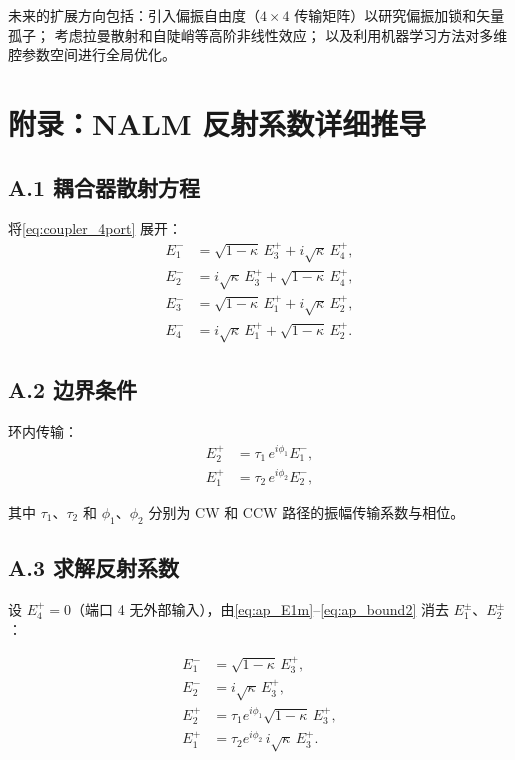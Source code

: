 \documentclass[11pt,a4paper]{ctexart}
\begin{document}
未来的扩展方向包括：引入偏振自由度（$4\times4$ 传输矩阵）以研究偏振加锁和矢量孤子；
考虑拉曼散射和自陡峭等高阶非线性效应；
以及利用机器学习方法对多维腔参数空间进行全局优化。

\section*{附录：NALM 反射系数详细推导}
\appendix

\subsection*{A.1 耦合器散射方程}

将\cref{eq:coupler_4port} 展开：
\begin{align}
  E_1^- &= \sqrt{1-\kappa}\, E_3^+ + i\sqrt{\kappa}\, E_4^+, \label{eq:ap_E1m}\\
  E_2^- &= i\sqrt{\kappa}\, E_3^+ + \sqrt{1-\kappa}\, E_4^+, \label{eq:ap_E2m}\\
  E_3^- &= \sqrt{1-\kappa}\, E_1^+ + i\sqrt{\kappa}\, E_2^+, \label{eq:ap_E3m}\\
  E_4^- &= i\sqrt{\kappa}\, E_1^+ + \sqrt{1-\kappa}\, E_2^+. \label{eq:ap_E4m}
\end{align}

\subsection*{A.2 边界条件}

环内传输：
\begin{align}
  E_2^+ &= \tau_1 \, e^{i\phi_1} E_1^-, \label{eq:ap_bound1}\\
  E_1^+ &= \tau_2 \, e^{i\phi_2} E_2^-, \label{eq:ap_bound2}
\end{align}

其中 $\tau_1$、$\tau_2$ 和 $\phi_1$、$\phi_2$ 分别为 CW 和 CCW 路径的振幅传输系数与相位。

\subsection*{A.3 求解反射系数}

设 $E_4^+ = 0$（端口 4 无外部输入），由\cref{eq:ap_E1m}--\eqref{eq:ap_bound2} 消去 $E_1^\pm$、$E_2^\pm$：

\begin{align}
  E_1^- &= \sqrt{1-\kappa}\, E_3^+, \\
  E_2^- &= i\sqrt{\kappa}\, E_3^+, \\
  E_2^+ &= \tau_1 e^{i\phi_1} \sqrt{1-\kappa}\, E_3^+, \\
  E_1^+ &= \tau_2 e^{i\phi_2} \, i\sqrt{\kappa}\, E_3^+.
\end{align}
\end{document}
